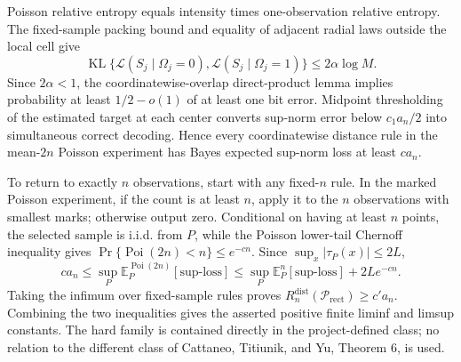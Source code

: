 Poisson relative entropy equals intensity times one-observation relative entropy.  The fixed-sample packing bound and equality of adjacent radial laws outside the local cell give
\[
\operatorname{KL}\{\mathcal L(S_j\mid\Omega_j=0),
\mathcal L(S_j\mid\Omega_j=1)\}
\leq2\alpha\log M.
\]
Since \(2\alpha<1\), the coordinatewise-overlap direct-product lemma implies probability at least \(1/2-o(1)\) of at least one bit error.  Midpoint thresholding of the estimated target at each center converts sup-norm error below \(c_1a_n/2\) into simultaneous correct decoding.  Hence every coordinatewise distance rule in the mean-\(2n\) Poisson experiment has Bayes expected sup-norm loss at least \(ca_n\).

To return to exactly \(n\) observations, start with any fixed-\(n\) rule.  In the marked Poisson experiment, if the count is at least \(n\), apply it to the \(n\) observations with smallest marks; otherwise output zero.  Conditional on having at least \(n\) points, the selected sample is i.i.d. from \(P\), while the Poisson lower-tail Chernoff inequality gives \(\Pr\{\operatorname{Poi}(2n)<n\}\leq e^{-cn}\).  Since \(\sup_x|\tau_P(x)|\leq2L\),
\[
ca_n\leq \sup_P\mathbb E_P^{\operatorname{Poi}(2n)}[\text{sup-loss}]
\leq \sup_P\mathbb E_P^n[\text{sup-loss}]+2Le^{-cn}.
\]
Taking the infimum over fixed-sample rules proves \(R_n^{\mathrm{dist}}(\mathcal P_{\mathrm{rect}})\geq c'a_n\).  Combining the two inequalities gives the asserted positive finite liminf and limsup constants.  The hard family is contained directly in the project-defined class; no relation to the different class of Cattaneo, Titiunik, and Yu, Theorem 6, is used.